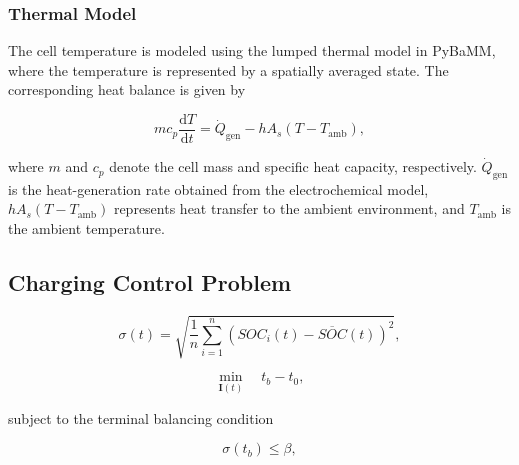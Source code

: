 \subsubsection{Thermal Model}

The cell temperature is modeled using the lumped thermal model in PyBaMM, where the temperature is represented by a spatially averaged state. The corresponding heat balance is given by

\begin{equation}\label{eqn:thermal}
    m c_p \frac{\mathrm{d}T}{\mathrm{d}t}
    =
    \dot{Q}_{\mathrm{gen}}
    -
    hA_s\left(T-T_{\mathrm{amb}}\right),
\end{equation}

where $m$ and $c_p$ denote the cell mass and specific heat capacity, respectively. 
$\dot{Q}_{\mathrm{gen}}$ is the heat-generation rate obtained from the electrochemical model, $hA_s(T-T_{\mathrm{amb}})$ represents heat transfer to the ambient environment, and $T_{\mathrm{amb}}$ is the ambient temperature.

\subsection{Charging Control Problem}


\begin{equation}\label{eq:soc_standard_deviation}
    \sigma(t)
    =
    \sqrt{
    \frac{1}{n}
    \sum_{i=1}^{n}
    \left(SOC_i(t)-\overline{SOC}(t)\right)^2
    },
\end{equation}


\begin{equation}\label{eqn:balancing objective}
    \min_{\mathbf{I}(t)} \quad t_b-t_0,
\end{equation}

subject to the terminal balancing condition

\begin{equation}\label{terminal balance}
    \sigma(t_b)\leq \beta,
\end{equation}

